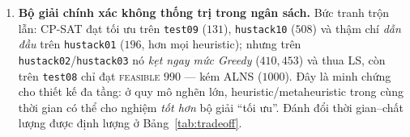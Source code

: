\begin{enumerate}[leftmargin=*]
  \item \textbf{Bộ giải chính xác không thống trị trong ngân sách.} Bức tranh trộn
  lẫn: CP-SAT đạt tối ưu trên \texttt{test09} ($131$), \texttt{hustack10} ($508$) và
  thậm chí \emph{dẫn đầu} trên \texttt{hustack01} ($196$, hơn mọi heuristic); nhưng
  trên \texttt{hustack02}/\texttt{hustack03} nó \emph{kẹt ngay mức Greedy}
  ($410, 453$) và thua LS, còn trên \texttt{test08} chỉ đạt \textsc{feasible} $990$
  --- kém ALNS ($1000$). Đây là minh chứng cho thiết kế đa tầng: ở quy mô nghẽn lớn,
  heuristic/metaheuristic trong cùng thời gian có thể cho nghiệm \emph{tốt hơn} bộ
  giải ``tối ưu''. Đánh đổi thời gian--chất lượng được định lượng ở
  Bảng~\ref{tab:tradeoff}.
\end{enumerate}


